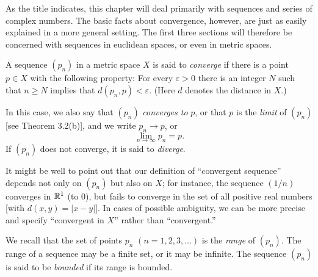 \noindent
As the title indicates, this chapter will deal primarily with sequences and
series of complex numbers. The basic facts about convergence, however, are just
as easily explained in a more general setting. The first three sections will
therefore be concerned with sequences in euclidean spaces, or even in metric
spaces.


A sequence $(p_n)$ in a metric space $X$ is said to \emph{converge} if there is
a point $p \in X$ with the following property: For every $\varepsilon > 0$
there is an integer $N$ such that $n \ge N$ implies that
$d(p_n,p) < \varepsilon$. (Here $d$ denotes the distance in $X$.)

In this case, we also say that $(p_n)$ \emph{converges to} $p$, or that $p$ is
the \emph{limit} of $(p_n)$ [see Theorem 3.2(b)], and we write $p_n \to p$, or
\[ \lim_{n\to\infty} p_n = p. \]
If $(p_n)$ does not converge, it is said to \emph{diverge}.

It might be well to point out that our definition of ``convergent sequence''
depends not only on $(p_n)$ but also on $X$; for instance, the sequence
$(1/n)$ converges in $\mathbb{R}^1$ (to $0$), but fails to converge in the set of all
positive real numbers [with $d(x,y) = |x-y|$]. In cases of possible ambiguity,
we can be more precise and specify ``convergent in $X$'' rather than
``convergent.''

We recall that the set of points $p_n$ $(n = 1,2,3,\dots)$ is the \emph{range}
of $(p_n)$. The range of a sequence may be a finite set, or it may be infinite.
The sequence $(p_n)$ is said to be \emph{bounded} if its range is bounded.

